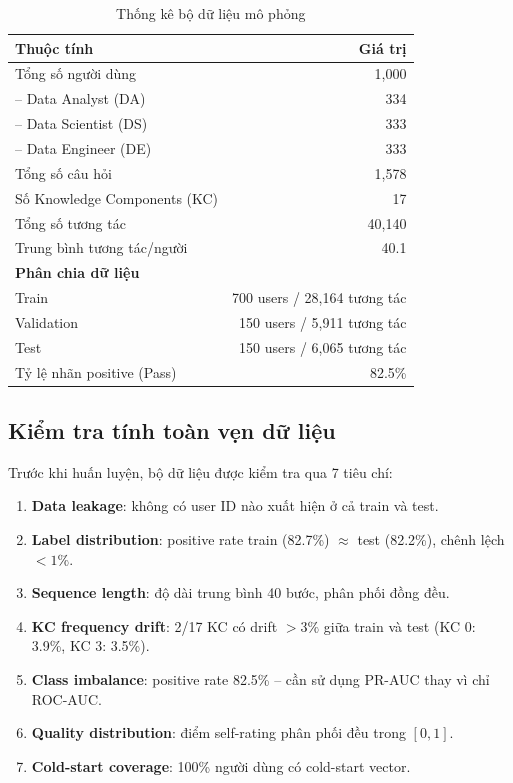 \begin{table}[H]
  \centering
  \caption{Thống kê bộ dữ liệu mô phỏng}
  \label{tab:dataset}
  \begin{tabular}{lr}
    \toprule
    \textbf{Thuộc tính} & \textbf{Giá trị} \\
    \midrule
    Tổng số người dùng & 1{,}000 \\
    \quad -- Data Analyst (DA) & 334 \\
    \quad -- Data Scientist (DS) & 333 \\
    \quad -- Data Engineer (DE) & 333 \\
    Tổng số câu hỏi & 1{,}578 \\
    Số Knowledge Components (KC) & 17 \\
    Tổng số tương tác & 40{,}140 \\
    Trung bình tương tác/người & 40.1 \\
    \midrule
    \textbf{Phân chia dữ liệu} & \\
    \quad Train & 700 users / 28{,}164 tương tác \\
    \quad Validation & 150 users / 5{,}911 tương tác \\
    \quad Test & 150 users / 6{,}065 tương tác \\
    \midrule
    Tỷ lệ nhãn positive (Pass) & 82.5\% \\
    \bottomrule
  \end{tabular}
\end{table}

\subsection{Kiểm tra tính toàn vẹn dữ liệu}

Trước khi huấn luyện, bộ dữ liệu được kiểm tra qua 7 tiêu chí:
\begin{enumerate}
  \item \textbf{Data leakage}: không có user ID nào xuất hiện ở cả train và test.
  \item \textbf{Label distribution}: positive rate train (82.7\%) $\approx$ test (82.2\%), chênh lệch $< 1\%$.
  \item \textbf{Sequence length}: độ dài trung bình 40 bước, phân phối đồng đều.
  \item \textbf{KC frequency drift}: 2/17 KC có drift $> 3\%$ giữa train và test (KC 0: 3.9\%, KC 3: 3.5\%).
  \item \textbf{Class imbalance}: positive rate 82.5\% -- cần sử dụng PR-AUC thay vì chỉ ROC-AUC.
  \item \textbf{Quality distribution}: điểm self-rating phân phối đều trong $[0, 1]$.
  \item \textbf{Cold-start coverage}: 100\% người dùng có cold-start vector.
\end{enumerate}

